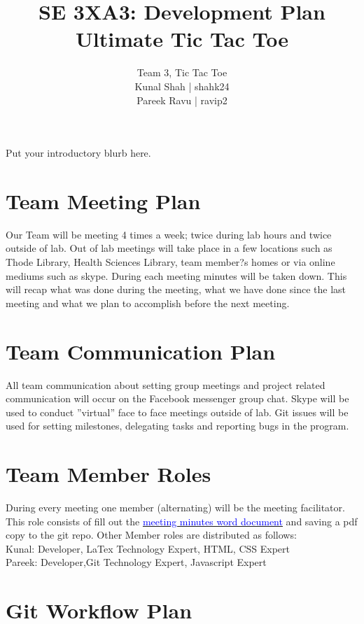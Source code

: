 \documentclass{article}
\title{SE 3XA3: Development Plan\\Ultimate Tic Tac Toe}
\author{Team 3, Tic Tac Toe
		\\ Kunal Shah | shahk24
		\\ Pareek Ravu | ravip2
}
\date{}
\begin{document}
\maketitle

Put your introductory blurb here.

\section{Team Meeting Plan}
Our Team will be meeting 4 times a week; twice during lab hours and twice outside of lab. Out of lab meetings will take place in a 
few locations such as Thode Library, Health Sciences Library, team member?s homes or via online mediums such as skype. 
During each meeting minutes will be taken down. This will recap what was done during the meeting, what we have done since the 
last meeting and what we plan to accomplish before the next meeting. \\

\section{Team Communication Plan}
All team communication about setting group meetings and project related communication will occur on the Facebook messenger
group chat. Skype will be used to conduct ''virtual'' face to face meetings outside of lab. Git issues will be used for setting milestones,
delegating tasks and reporting bugs in the program. \\

\section{Team Member Roles}
During every meeting one member (alternating) will be the meeting facilitator. This role consists of fill out the \href{run:3XA3 Meeting Summary Template.docx}{\textcolor{blue}{meeting minutes
word document}} and saving a pdf copy to the git repo. Other Member roles are distributed as follows:\\
Kunal: Developer, LaTex Technology Expert, HTML, CSS Expert \\
Pareek: Developer,Git Technology Expert, Javascript Expert \\

\section{Git Workflow Plan}
\end{document}
